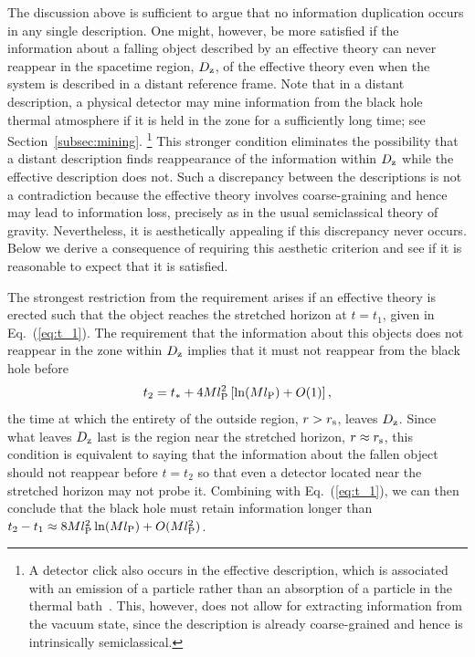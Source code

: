 \documentclass[12pt]{article}
\begin{document}
The discussion above is sufficient to argue that no information 
duplication occurs in any single description.  One might, however, 
be more satisfied if the information about a falling object 
described by an effective theory can never reappear in the 
spacetime region, $D_{\rm z}$, of the effective theory even when 
the system is described in a distant reference frame.  Note that 
in a distant description, a physical detector may mine information 
from the black hole thermal atmosphere if it is held in the zone 
for a sufficiently long time; see Section~\ref{subsec:mining}.%
\footnote{A detector click also occurs in the effective description, 
 which is associated with an emission of a particle rather than an 
 absorption of a particle in the thermal bath~\cite{Unruh:1983ms}. 
 This, however, does not allow for extracting information from the 
 vacuum state, since the description is already coarse-grained and 
 hence is intrinsically semiclassical.}
This stronger condition eliminates the possibility that a distant 
description finds reappearance of the information within $D_{\rm z}$ 
while the effective description does not.  Such a discrepancy 
between the descriptions is not a contradiction because the 
effective theory involves coarse-graining and hence may lead 
to information loss, precisely as in the usual semiclassical 
theory of gravity.  Nevertheless, it is aesthetically appealing 
if this discrepancy never occurs.  Below we derive a consequence 
of requiring this aesthetic criterion and see if it is reasonable 
to expect that it is satisfied.

The strongest restriction from the requirement arises if an 
effective theory is erected such that the object reaches the 
stretched horizon at $t = t_1$, given in Eq.~(\ref{eq:t_1}). 
The requirement that the information about this objects does 
not reappear in the zone within $D_{\rm z}$ implies that it 
must not reappear from the black hole before
%
\begin{equation}
  t_2 = t_* + 4Ml_{\rm P}^2 \left[ \ln(Ml_{\rm P}) + O(1) \right],
\label{eq:t_2}
\end{equation}
%
the time at which the entirety of the outside region, $r > r_{\rm s}$, 
leaves $D_{\rm z}$.  Since what leaves $D_{\rm z}$ last is the 
region near the stretched horizon, $r \approx r_{\rm s}$, this 
condition is equivalent to saying that the information about 
the fallen object should not reappear before $t = t_2$ so that 
even a detector located near the stretched horizon may not probe 
it.  Combining with Eq.~(\ref{eq:t_1}), we can then conclude that 
the black hole must retain information longer than $t_2-t_1 \approx 
8Ml_{\rm P}^2 \ln(Ml_{\rm P}) + O(Ml_{\rm P}^2)$.
\end{document}
